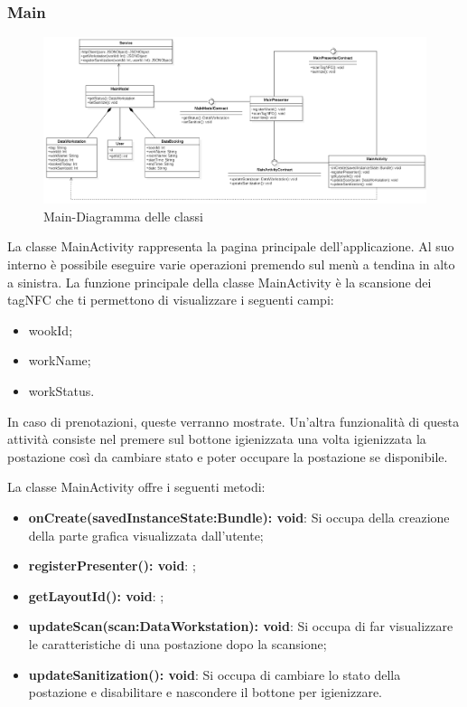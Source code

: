 \subsubsection{Main}
\begin{figure}[H]
	\centering
	\includegraphics[width=16cm]{res/images/apputenti-MainClass.png}
	\caption{Main-Diagramma delle classi}
	\label{fig:Main-Diagramma delle classi}
\end{figure}
La classe MainActivity rappresenta la pagina principale dell'applicazione. Al suo interno è possibile eseguire varie operazioni premendo sul menù a tendina in alto a sinistra.
La funzione principale della classe MainActivity è la scansione dei tagNFC che ti permettono di visualizzare i seguenti campi:
\begin{itemize}
	\item wookId; 
	\item workName; 
	\item workStatus. 
\end{itemize}
In caso di prenotazioni, queste verranno mostrate.
Un'altra funzionalità di questa attività consiste nel premere sul bottone igienizzata una volta igienizzata la postazione così da cambiare stato e poter occupare la postazione se disponibile.

La classe MainActivity offre i seguenti metodi:
\begin{itemize}
	\item \textbf{onCreate(savedInstanceState:Bundle): void}: Si occupa della creazione della parte grafica visualizzata dall'utente; 
	\item \textbf{registerPresenter(): void}: ; 
	\item \textbf{getLayoutId(): void}: ;
	\item \textbf{updateScan(scan:DataWorkstation): void}: Si occupa di far visualizzare le caratteristiche di una postazione dopo la scansione; 
	\item \textbf{updateSanitization(): void}: Si occupa di cambiare lo stato della postazione e disabilitare e nascondere il bottone per igienizzare. 
\end{itemize}

